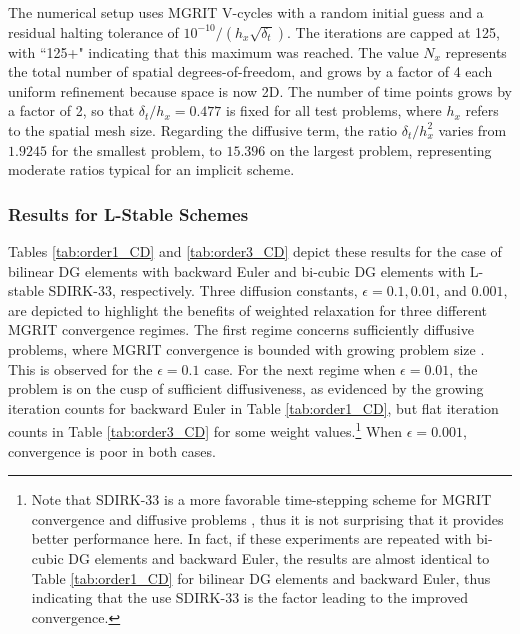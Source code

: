 \documentclass[VANCOUVER,STIX1COL]{WileyNJD-v2}
\begin{document}
%


The numerical setup uses MGRIT V-cycles with a random initial guess and a residual halting tolerance of $10^{-10} / (h_x \sqrt{\delta_t}) $.  
The iterations are capped at 125, with ``125+" indicating that this maximum was
reached.  The value $N_x$ represents the total number of spatial
degrees-of-freedom, and grows by a factor of 4 each uniform refinement because space is now
2D.  The number of time points grows by a factor of 2, so that $\delta_t /
h_x = 0.477$ is fixed for all test problems, where $h_x$ refers to the spatial mesh size. 
Regarding the diffusive term, the 
ratio $\delta_t / h_x^2$ varies from $1.9245$ for the smallest problem, to $15.396$
on the largest problem, representing moderate ratios typical for an implicit scheme.

\subsubsection{Results for L-Stable Schemes}
\label{sec:lstable}
Tables \ref{tab:order1_CD} and \ref{tab:order3_CD} depict these results for the
case of bilinear DG elements with backward Euler and bi-cubic DG elements with L-stable
SDIRK-33, respectively.   Three diffusion constants, $\epsilon = 0.1, 0.01$, and
$0.001$, are depicted to highlight the benefits of weighted relaxation for
three different MGRIT convergence regimes.  The first regime concerns
sufficiently diffusive problems, where MGRIT convergence is bounded with
growing problem size \cite{Do2016}.  This is observed for the $\epsilon=0.1$
case.  For the next regime when $\epsilon=0.01$, the problem is on the cusp of
sufficient diffusiveness, as evidenced by the growing iteration counts for
backward Euler in Table \ref{tab:order1_CD}, but flat iteration counts in Table
\ref{tab:order3_CD} for some weight values.\footnote{Note that SDIRK-33 is a
more favorable time-stepping scheme for MGRIT convergence and diffusive
problems \cite{Do2016}, thus it is not surprising that it provides better
performance here.  In fact, if these experiments are repeated with bi-cubic DG
elements and backward Euler, the results are almost identical to Table
\ref{tab:order1_CD} for bilinear DG elements and backward Euler, thus
indicating that the use SDIRK-33 is the factor leading to the improved
convergence.} When $\epsilon = 0.001$, convergence is poor in both cases.
\end{document}
